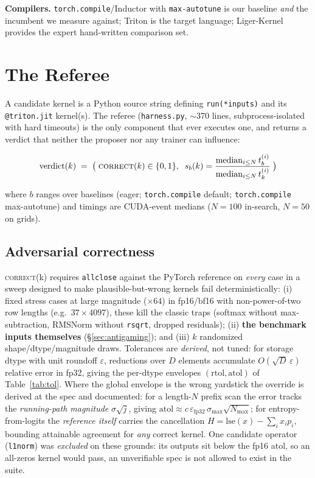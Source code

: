 \documentclass[10pt]{article}
\newcommand{\maxauto}{\texttt{torch.compile} max-autotune}
\begin{document}
\textbf{Compilers.} \texttt{torch.compile}/Inductor with \texttt{max-autotune}
\cite{pytorch2} is our baseline \emph{and} the incumbent we measure against; Triton
\cite{triton} is the target language; Liger-Kernel~\cite{liger} provides the expert
hand-written comparison set.

\section{The Referee}\label{sec:harness}

A candidate kernel is a Python source string defining \texttt{run(*inputs)} and its
\texttt{@triton.jit} kernel(s). The referee (\texttt{harness.py}, $\sim$370 lines,
subprocess-isolated with hard timeouts) is the only component that ever executes one, and
returns a verdict that neither the proposer nor any trainer can influence:

\begin{equation}
\text{verdict}(k) \;=\; \big(\;\textsc{correct}(k)\in\{0,1\},\;\;
s_b(k) = \frac{\operatorname{median}_{i\le N} t_b^{(i)}}{\operatorname{median}_{i\le N} t_k^{(i)}}\;\big)
\end{equation}

\noindent where $b$ ranges over baselines (eager; \texttt{torch.compile} default;
\maxauto{}) and timings are CUDA-event medians ($N{=}100$ in-search, $N{=}50$ on grids).

\subsection{Adversarial correctness}\label{sec:correctness}

\textsc{correct}(k) requires \texttt{allclose} against the PyTorch reference on
\emph{every} case in a sweep designed to make plausible-but-wrong kernels fail
deterministically: (i) fixed stress cases at large magnitude ($\times 64$) in fp16/bf16
with non-power-of-two row lengths (e.g.\ $37\times4097$), these kill the classic traps
(softmax without max-subtraction, RMSNorm without \texttt{rsqrt}, dropped residuals);
(ii) \textbf{the benchmark inputs themselves} (\S\ref{sec:antigaming}); and (iii) $k$
randomized shape/dtype/magnitude draws. Tolerances are \emph{derived}, not tuned:
for storage dtype with unit roundoff $\varepsilon$, reductions over $D$ elements
accumulate $O(\sqrt{D}\,\varepsilon)$ relative error in fp32, giving the per-dtype
envelopes $(\text{rtol},\text{atol})$ of Table~\ref{tab:tol}. Where the global envelope is
the wrong yardstick the override is derived at the spec and documented: for a length-$N$
prefix scan the error tracks the \emph{running-path magnitude}
$\sigma\sqrt{j}$, giving $\text{atol} \approx c\,\varepsilon_{\mathrm{fp32}}\,
\sigma_{\max}\sqrt{N_{\max}}$; for entropy-from-logits the \emph{reference itself}
carries the cancellation $H = \mathrm{lse}(x) - \sum_i x_i p_i$, bounding attainable
agreement for \emph{any} correct kernel. One candidate operator (\texttt{l1norm}) was
\emph{excluded} on these grounds: its outputs sit below the fp16 atol, so an all-zeros
kernel would pass, an unverifiable spec is not allowed to exist in the suite.
\end{document}
